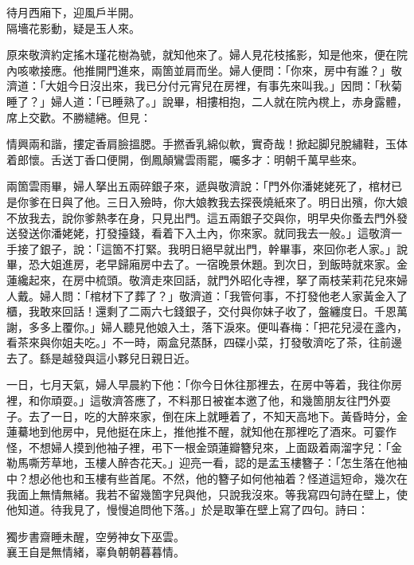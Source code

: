 \begin{myquote}
待月西廂下，迎風戶半開。\\隔墻花影動，疑是玉人來。
\end{myquote}

原來敬濟約定搖木瑾花樹為號，就知他來了。婦人見花枝搖影，知是他來，便在院內咳嗽接應。他推開門進來，兩箇並肩而坐。婦人便問：「你來，房中有誰？」敬濟道：「大姐今日沒出來，我已分付元宵兒在房裡，有事先來叫我。」因問：「秋菊睡了？」婦人道：「已睡熟了。」說畢，相摟相抱，二人就在院內櫈上，赤身露體，席上交歡。不勝繾綣。但見：

\begin{myquote}
情興兩和諧，摟定香肩臉搵腮。手撚香乳綿似軟，實奇哉！掀起脚兒脫繡鞋，玉体着郎懷。舌送丁香口便開，倒鳳顛鸞雲雨罷，囑多才：明朝千萬早些來。
\end{myquote}

兩箇雲雨畢，婦人拏出五兩碎銀子來，遞與敬濟說：「門外你潘姥姥死了，棺材已是你爹在日與了他。三日入殮時，你大娘教我去探䘮燒紙來了。明日出殯，你大娘不放我去，說你爹熱孝在身，只見出門。這五兩銀子交與你，明早央你蚤去門外發送發送你潘姥姥，打發擡錢，看着下入土內，你來家。就同我去一般。」{}這敬濟一手接了銀子，說：「這箇不打緊。我明日絕早就出門，幹畢事，來回你老人家。」說畢，恐大姐進房，老早歸廂房中去了。一宿晚景休題。到次日，到飯時就來家。金蓮纔起來，在房中梳頭。敬濟走來回話，就門外昭化寺裡，拏了兩枝茉莉花兒來婦人戴。婦人問：「棺材下了葬了？」敬濟道：「我管何事，不打發他老人家黃金入了櫃，我敢來回話！還剩了二兩六七錢銀子，交付與你妹子收了，盤纏度日。千恩萬謝，多多上覆你。」婦人聽見他娘入土，落下淚來。{}便叫春梅：「把花兒浸在盞內，看茶來與你姐夫吃。」不一時，兩盒兒蒸酥，四碟小菜，打發敬濟吃了茶，往前邊去了。繇是越發與這小夥兒日親日近。

一日，七月天氣，婦人早晨約下他：「你今日休往那裡去，在房中等着，我往你房裡，和你頑耍。」這敬濟答應了，不料那日被崔本邀了他，和幾箇朋友往門外耍子。去了一日，吃的大醉來家，倒在床上就睡着了，不知天高地下。黃昏時分，金蓮驀地到他房中，見他挺在床上，推他推不醒，就知他在那裡吃了酒來。可霎作怪，不想婦人摸到他袖子裡，弔下一根金頭蓮瓣簪兒來，上面趿着兩溜字兒：「金勒馬嘶芳草地，玉樓人醉杏花天。」{}迎亮一看，認的是孟玉樓簪子：「怎生落在他袖中？想必他也和玉樓有些首尾。不然，他的簪子如何他袖着？怪道這短命，幾次在我面上無情無緒。我若不留幾箇字兒與他，只說我沒來。等我寫四句詩在壁上，使他知道。待我見了，慢慢追問他下落。」於是取筆在壁上寫了四句。詩曰：

\begin{myquote}
獨步書齋睡未醒，空勞神女下巫雲。\\襄王自是無情緒，辜負朝朝暮暮情。
\end{myquote}

